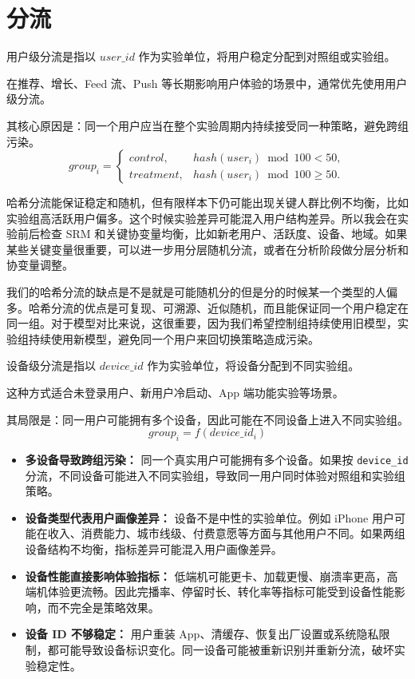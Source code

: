 \section{分流}
\begin{theorem}[用户级分流]
用户级分流是指以 $user\_id$ 作为实验单位，将用户稳定分配到对照组或实验组。

在推荐、增长、Feed 流、Push 等长期影响用户体验的场景中，通常优先使用用户级分流。

其核心原因是：同一个用户应当在整个实验周期内持续接受同一种策略，避免跨组污染。
\[
group_i =
\begin{cases}
control, & hash(user_i) \bmod 100 < 50, \\
treatment, & hash(user_i) \bmod 100 \geq 50.
\end{cases}
\]
\end{theorem}
\begin{note}
    哈希分流能保证稳定和随机，但有限样本下仍可能出现关键人群比例不均衡，比如实验组高活跃用户偏多。这个时候实验差异可能混入用户结构差异。所以我会在实验前后检查 SRM 和关键协变量均衡，比如新老用户、活跃度、设备、地域。如果某些关键变量很重要，可以进一步用分层随机分流，或者在分析阶段做分层分析和协变量调整。
\end{note}
\begin{dxtips}
    我们的哈希分流的缺点是不是就是可能随机分的但是分的时候某一个类型的人偏多。哈希分流的优点是可复现、可溯源、近似随机，而且能保证同一个用户稳定在同一组。对于模型对比来说，这很重要，因为我们希望控制组持续使用旧模型，实验组持续使用新模型，避免同一个用户来回切换策略造成污染。
\end{dxtips}
\begin{theorem}[设备级分流]
设备级分流是指以 $device\_id$ 作为实验单位，将设备分配到不同实验组。

这种方式适合未登录用户、新用户冷启动、App 端功能实验等场景。

其局限是：同一用户可能拥有多个设备，因此可能在不同设备上进入不同实验组。
\[
group_i = f(device\_id_i)
\]
\end{theorem}
\begin{itemize}
    \item \textbf{多设备导致跨组污染：}
    同一个真实用户可能拥有多个设备。如果按 \texttt{device\_id} 分流，不同设备可能进入不同实验组，导致同一用户同时体验对照组和实验组策略。

    \item \textbf{设备类型代表用户画像差异：}
    设备不是中性的实验单位。例如 iPhone 用户可能在收入、消费能力、城市线级、付费意愿等方面与其他用户不同。如果两组设备结构不均衡，指标差异可能混入用户画像差异。

    \item \textbf{设备性能直接影响体验指标：}
    低端机可能更卡、加载更慢、崩溃率更高，高端机体验更流畅。因此完播率、停留时长、转化率等指标可能受到设备性能影响，而不完全是策略效果。

    \item \textbf{设备 ID 不够稳定：}
    用户重装 App、清缓存、恢复出厂设置或系统隐私限制，都可能导致设备标识变化。同一设备可能被重新识别并重新分流，破坏实验稳定性。
\end{itemize}
